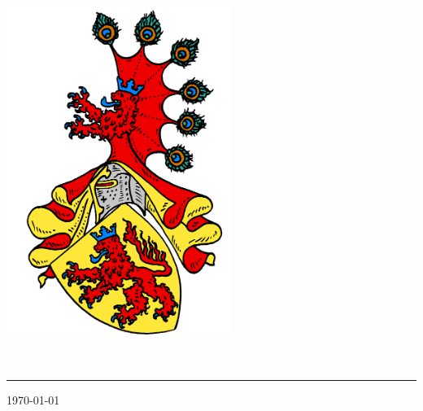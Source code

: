 \documentclass[11pt,a4paper]{article}
\def\firstname{Pascal}
\def\familyname{Bernhard}
\begin{document}
\sffamily   %
\hfill%
\begin{minipage}[t]{.6\textwidth}
\raggedleft%
\includegraphics[width=0.55\textwidth]{Habsburg-Stammwappen.png}


\end{minipage}\\[0.5em]
%
{\color{firstnamecolor}\rule{\textwidth}{.25ex}}
%
\begin{minipage}[t]{.4\textwidth}
	\raggedright%
	\vspace*{1em}
	\small%
\end{minipage}
%
\hfill
%
\begin{minipage}[t]{.4\textwidth}
	\raggedleft %
	\today
\end{minipage}\\[2.2em]
\end{document}
